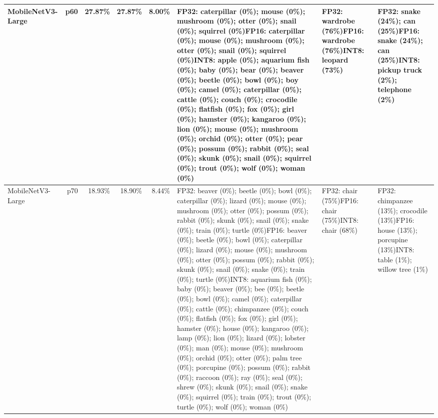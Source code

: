 \begin{longtable}{p{2.8cm} r r r r p{5.0cm} p{4.2cm} p{4.2cm}}
MobileNetV3-Large & p60 & 27.87\% & 27.87\% & 8.00\% & FP32: caterpillar (0\%); mouse (0\%); mushroom (0\%); otter (0\%); snail (0\%); squirrel (0\%)\newline FP16: caterpillar (0\%); mouse (0\%); mushroom (0\%); otter (0\%); snail (0\%); squirrel (0\%)\newline INT8: apple (0\%); aquarium fish (0\%); baby (0\%); bear (0\%); beaver (0\%); beetle (0\%); bowl (0\%); boy (0\%); camel (0\%); caterpillar (0\%); cattle (0\%); couch (0\%); crocodile (0\%); flatfish (0\%); fox (0\%); girl (0\%); hamster (0\%); kangaroo (0\%); lion (0\%); mouse (0\%); mushroom (0\%); orchid (0\%); otter (0\%); pear (0\%); possum (0\%); rabbit (0\%); seal (0\%); skunk (0\%); snail (0\%); squirrel (0\%); trout (0\%); wolf (0\%); woman (0\%) & FP32: wardrobe (76\%)\newline FP16: wardrobe (76\%)\newline INT8: leopard (73\%) & FP32: snake (24\%); can (25\%)\newline FP16: snake (24\%); can (25\%)\newline INT8: pickup truck (2\%); telephone (2\%) \\ \hline
MobileNetV3-Large & p70 & 18.93\% & 18.90\% & 8.44\% & FP32: beaver (0\%); beetle (0\%); bowl (0\%); caterpillar (0\%); lizard (0\%); mouse (0\%); mushroom (0\%); otter (0\%); possum (0\%); rabbit (0\%); skunk (0\%); snail (0\%); snake (0\%); train (0\%); turtle (0\%)\newline FP16: beaver (0\%); beetle (0\%); bowl (0\%); caterpillar (0\%); lizard (0\%); mouse (0\%); mushroom (0\%); otter (0\%); possum (0\%); rabbit (0\%); skunk (0\%); snail (0\%); snake (0\%); train (0\%); turtle (0\%)\newline INT8: aquarium fish (0\%); baby (0\%); beaver (0\%); bee (0\%); beetle (0\%); bowl (0\%); camel (0\%); caterpillar (0\%); cattle (0\%); chimpanzee (0\%); couch (0\%); flatfish (0\%); fox (0\%); girl (0\%); hamster (0\%); house (0\%); kangaroo (0\%); lamp (0\%); lion (0\%); lizard (0\%); lobster (0\%); man (0\%); mouse (0\%); mushroom (0\%); orchid (0\%); otter (0\%); palm tree (0\%); porcupine (0\%); possum (0\%); rabbit (0\%); raccoon (0\%); ray (0\%); seal (0\%); shrew (0\%); skunk (0\%); snail (0\%); snake (0\%); squirrel (0\%); train (0\%); trout (0\%); turtle (0\%); wolf (0\%); woman (0\%) & FP32: chair (75\%)\newline FP16: chair (75\%)\newline INT8: chair (68\%) & FP32: chimpanzee (13\%); crocodile (13\%)\newline FP16: house (13\%); porcupine (13\%)\newline INT8: table (1\%); willow tree (1\%) \\ \hline

\end{longtable}
